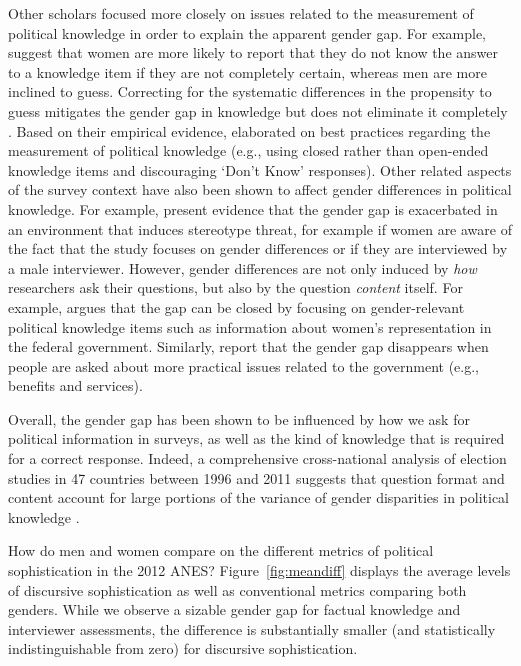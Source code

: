 \documentclass[12pt]{article}
\begin{document}
Other scholars focused more closely on issues related to the measurement of political knowledge in order to explain the apparent gender gap. For example, \citet{mondak2004knowledge} suggest that women are more likely to report that they do not know the answer to a knowledge item if they are not completely certain, whereas men are more inclined to guess. Correcting for the systematic differences in the propensity to guess mitigates the gender gap in knowledge but does not eliminate it completely \citep[see also][]{lizotte2009explaining}. Based on their empirical evidence, \citet{mondak2004knowledge} elaborated on best practices regarding the measurement of political knowledge (e.g., using closed rather than open-ended knowledge items and discouraging `Don't Know' responses). Other related aspects of the survey context have also been shown to affect gender differences in political knowledge. For example, \citet{mcglone2006stereotype} present evidence that the gender gap is exacerbated in an environment that induces stereotype threat, for example if women are aware of the fact that the study focuses on gender differences or if they are interviewed by a male interviewer. However, gender differences are not only induced by \textit{how} researchers ask their questions, but also by the question \textit{content} itself. For example, \citet{dolan2011women} argues that the gap can be closed by focusing on gender-relevant political knowledge items such as information about women's representation in the federal government. Similarly, \citet{stolle2010women} report that the gender gap disappears when people are asked about more practical issues related to the government (e.g., benefits and services).

Overall, the gender gap has been shown to be influenced by how we ask for political information in surveys, as well as the kind of knowledge that is required for a correct response. Indeed, a comprehensive cross-national analysis of election studies in 47 countries between 1996 and 2011 suggests that question format and content account for large portions of the variance of gender disparities in political knowledge \citep{fortin2016cross}.



How do men and women compare on the different metrics of political sophistication in the 2012 ANES? Figure~\ref{fig:meandiff} displays the average levels of discursive sophistication as well as conventional metrics comparing both genders. While we observe a sizable gender gap for factual knowledge and interviewer assessments, the difference is substantially smaller (and statistically indistinguishable from zero) for discursive sophistication. %
\end{document}
